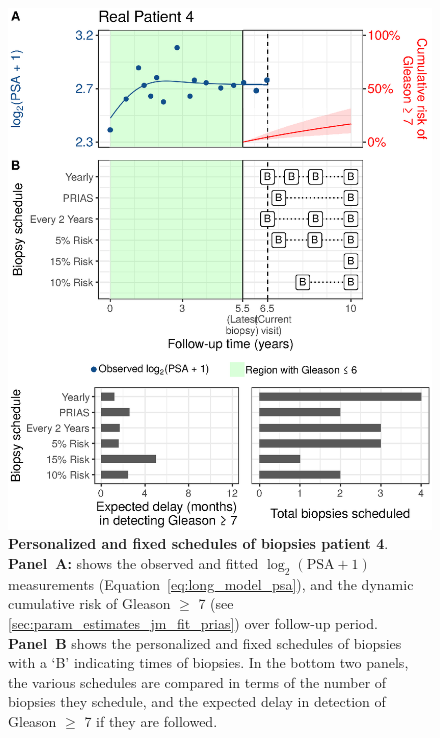 \begin{figure}
\centerline{\includegraphics[width=\columnwidth]{images/demo_pat4_supp.eps}}
\caption{\textbf{Personalized and fixed schedules of biopsies patient 4}. \textbf{Panel~A:} shows the observed and fitted $\log_2(\mbox{PSA} + 1)$ measurements (Equation~\ref{eq:long_model_psa}), and the dynamic cumulative risk of Gleason $\geq$ 7 (see \ref{sec:param_estimates_jm_fit_prias}) over follow-up period. \textbf{Panel~B} shows the personalized and fixed schedules of biopsies with a `B' indicating times of biopsies. In the bottom two panels, the various schedules are compared in terms of the number of biopsies they schedule, and the expected delay in detection of Gleason $\geq$ 7 if they are followed.}
\label{fig:demo_pat4_supp}
\end{figure}
